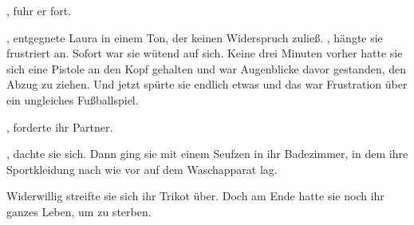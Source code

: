 , fuhr er fort. 

\par

, entgegnete Laura in einem Ton, der keinen Widerspruch zuließ. , hängte sie frustriert an. Sofort war sie wütend auf sich. Keine drei Minuten vorher hatte sie sich eine Pistole an den Kopf gehalten und war Augenblicke davor gestanden, den Abzug zu ziehen. Und jetzt spürte sie endlich etwas und das war Frustration über ein ungleiches Fußballspiel.

\par

, forderte ihr Partner.

\par

, dachte sie sich. Dann ging sie mit einem Seufzen in ihr Badezimmer, in dem ihre Sportkleidung nach wie vor auf dem Waschapparat lag.

\par

Widerwillig streifte sie sich ihr Trikot über. Doch am Ende hatte sie noch ihr ganzes Leben, um zu sterben.